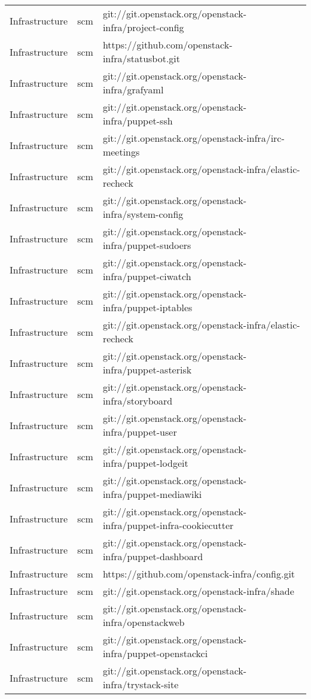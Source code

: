\begin{center}
\begin{longtable}{|p{4cm}|p{1cm}|p{10cm}|}
Infrastructure&scm&git://git.openstack.org/openstack-infra/project-config\\ 
Infrastructure&scm&https://github.com/openstack-infra/statusbot.git\\ 
Infrastructure&scm&git://git.openstack.org/openstack-infra/grafyaml\\ 
Infrastructure&scm&git://git.openstack.org/openstack-infra/puppet-ssh\\ 
Infrastructure&scm&git://git.openstack.org/openstack-infra/irc-meetings\\ 
Infrastructure&scm&git://git.openstack.org/openstack-infra/elastic-recheck\\ 
Infrastructure&scm&git://git.openstack.org/openstack-infra/system-config\\ 
Infrastructure&scm&git://git.openstack.org/openstack-infra/puppet-sudoers\\ 
Infrastructure&scm&git://git.openstack.org/openstack-infra/puppet-ciwatch\\ 
Infrastructure&scm&git://git.openstack.org/openstack-infra/puppet-iptables\\ 
Infrastructure&scm&git://git.openstack.org/openstack-infra/elastic-recheck\\ 
Infrastructure&scm&git://git.openstack.org/openstack-infra/puppet-asterisk\\ 
Infrastructure&scm&git://git.openstack.org/openstack-infra/storyboard\\ 
Infrastructure&scm&git://git.openstack.org/openstack-infra/puppet-user\\ 
Infrastructure&scm&git://git.openstack.org/openstack-infra/puppet-lodgeit\\ 
Infrastructure&scm&git://git.openstack.org/openstack-infra/puppet-mediawiki\\ 
Infrastructure&scm&git://git.openstack.org/openstack-infra/puppet-infra-cookiecutter\\ 
Infrastructure&scm&git://git.openstack.org/openstack-infra/puppet-dashboard\\ 
Infrastructure&scm&https://github.com/openstack-infra/config.git\\ 
Infrastructure&scm&git://git.openstack.org/openstack-infra/shade\\ 
Infrastructure&scm&git://git.openstack.org/openstack-infra/openstackweb\\ 
Infrastructure&scm&git://git.openstack.org/openstack-infra/puppet-openstackci\\ 
Infrastructure&scm&git://git.openstack.org/openstack-infra/trystack-site\\ 

\end{longtable}
\end{center}
